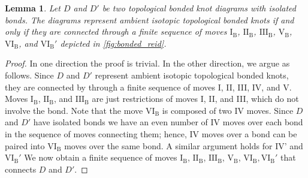 \documentclass{article}
\theoremstyle{definition}
\theoremstyle{plain}
\newtheorem{lemma}{Lemma}[section]
\theoremstyle{remark}
\begin{document}

\begin{lemma}
    Let $D$ and $D'$ be two topological bonded knot diagrams with isolated bonds. The diagrams represent ambient isotopic topological bonded knots if and only if they are connected through a finite sequence of moves $\mathrm{I_B}$, $\mathrm{II_B}$, $\mathrm{III_B}$, $\mathrm{V_B}$, $\mathrm{VI_B}$, and $\mathrm{VI_B'}$ depicted in \autoref{fig:bonded_reid}.%
\end{lemma}


\begin{proof} In one direction the proof is trivial. In the other direction, we argue as follows.
    Since $D$ and $D'$ represent ambient isotopic topological bonded knots, they are connected by through a finite sequence of moves I, II, III, IV, and V. Moves $\mathrm{I_B}$, $\mathrm{II_B}$, and $\mathrm{III_B}$ are just restrictions of moves I, II, and III, which do not involve the bond. 
    Note that the move $\mathrm{VI_B}$ is composed of two IV moves.  Since $D $ and $D'$ have isolated bonds we have an even number of IV moves over each bond in the sequence of moves connecting them; hence, IV moves over a bond can be paired into $\mathrm{VI_B}$ moves over the same bond. A similar argument holds for IV' and $\mathrm{VI_B'}$
    We now obtain a finite sequence of moves $\mathrm{I_B}$, $\mathrm{II_B}$, $\mathrm{III_B}$, $\mathrm{V_B}$, $\mathrm{VI_B}, \mathrm{VI_B'}$ that connects $D$ and $D'$.
    
\end{proof}
\end{document}
